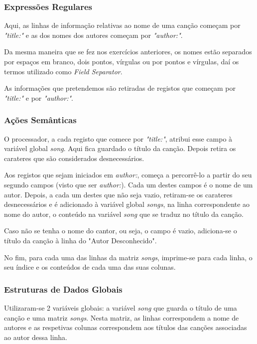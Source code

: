 \documentclass{article}
\begin{document}
\subsubsection{Expressões Regulares}

Aqui, as linhas de informação relativas ao nome de uma canção começam por   \emph{"title:"} e as dos nomes dos autores começam por \emph{"author:"}.

Da mesma maneira que se fez nos exercícios anteriores, os nomes estão separados por espaços em branco, dois pontos, vírgulas ou por pontos e vírgulas, daí os termos utilizado como \emph{Field Separator}.

As informações que pretendemos são retiradas de registos que começam por \emph{"title:"} e por \emph{"author:"}.

\subsubsection{Ações Semânticas}

O processador, a cada registo que comece por \emph{"title:"}, atribui esse campo à variável global \emph{song}. Aqui fica guardado o título da canção. Depois retira os carateres que são considerados desnecessários.

Aos registos que sejam iniciados em \emph{author:}, começa a percorrê-lo a partir do seu segundo campos (visto que ser \emph{author:}). Cada um destes campos é o nome de um autor. Depois, a cada um destes que não seja vazio, retiram-se os carateres desnecessários e é adicionado à variável global \emph{songs}, na linha correspondente ao nome do autor, o  conteúdo na variável \emph{song} que se traduz no título da canção.

Caso não se tenha o nome do cantor, ou seja, o campo é vazio, adiciona-se o título da canção à linha do "Autor Desconhecido".

No fim, para cada uma das linhas da matriz \emph{songs}, imprime-se para cada linha, o seu índice e os conteúdos de cada uma das suas colunas.

\subsubsection{Estruturas de Dados Globais}

Utilizaram-se 2 variáveis globais: a variável \emph{song} que guarda o título de uma canção e uma matriz \emph{songs}. Nesta matriz, as linhas correspondem a nome de autores e as respetivas colunas correspondem aos títulos das canções associadas ao autor dessa linha.
\end{document}
